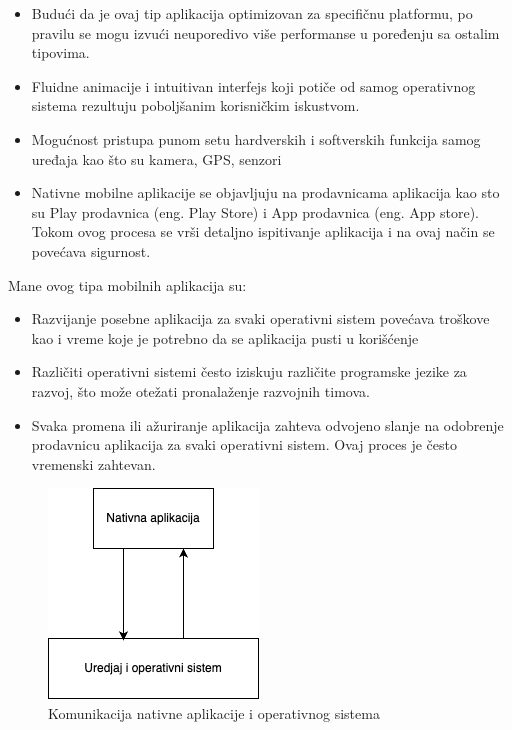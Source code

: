 \documentclass[12pt,oneside]{memoir}
\begin{document}
\begin{itemize}
    \item Budući da je ovaj tip aplikacija optimizovan za specifičnu platformu, po pravilu se mogu izvući neuporedivo više performanse u poređenju sa ostalim tipovima.
    \item Fluidne animacije i intuitivan interfejs koji potiče od samog operativnog sistema rezultuju poboljšanim korisničkim iskustvom.
    \item Mogućnost pristupa punom setu hardverskih i softverskih funkcija samog uređaja kao što su kamera, GPS, senzori
    \item Nativne mobilne aplikacije se objavljuju na prodavnicama aplikacija kao sto su Play prodavnica (eng. Play Store) i App prodavnica (eng. App store). Tokom ovog procesa se vrši detaljno ispitivanje aplikacija i na ovaj način se povećava sigurnost.
\end{itemize}
Mane ovog tipa mobilnih aplikacija su:
\begin{itemize}
    \item Razvijanje posebne aplikacija za svaki operativni sistem povećava troškove kao i vreme koje je potrebno da se aplikacija pusti u korišćenje
    \item Različiti operativni sistemi često iziskuju različite programske jezike za razvoj, što može otežati pronalaženje razvojnih timova.
    \item Svaka promena ili ažuriranje aplikacija zahteva odvojeno slanje na odobrenje prodavnicu aplikacija za svaki operativni sistem. Ovaj proces je često vremenski zahtevan.
\end{itemize}

\begin{figure}[h]
    \centering
    \includegraphics[scale=0.5]{docs/images/chapterTwo/nativnaAplikacija.png}
    \caption{Komunikacija nativne aplikacije i operativnog sistema}
    \label{fig:nativnaAplikacija}
\end{figure}
\end{document}

